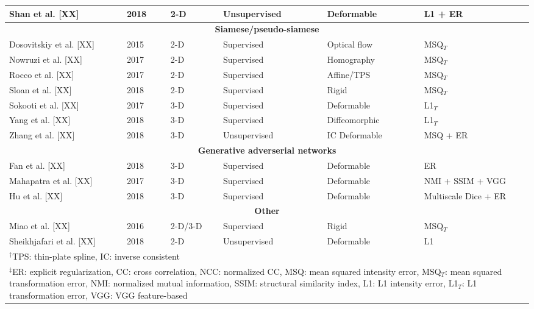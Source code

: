 \begin{table}[!htb]
\begin{tabular*}{\textwidth}{l@{\extracolsep{\fill}}l@{\extracolsep{\fill}}l@{\extracolsep{\fill}}l@{\extracolsep{\fill}}l@{\extracolsep{\fill}}l}
  Shan et al. [XX] & 2018 & 2-D & Unsupervised & Deformable & L1 + ER \\
\midrule
\multicolumn{6}{c}{\textbf{Siamese/pseudo-siamese}}
  \vspace{0.25cm} \\
  Dosovitskiy et al. [XX] & 2015 & 2-D & Supervised & Optical flow & MSQ$_T$ \\ %
  Nowruzi et al. [XX] & 2017 & 2-D & Supervised & Homography & MSQ$_T$ \\
  Rocco et al. [XX] & 2017 & 2-D & Supervised & Affine/TPS & MSQ$_T$ \\
  Sloan et al. [XX] & 2018 & 2-D & Supervised & Rigid & MSQ$_T$ \\  %
  Sokooti et al. [XX] & 2017 & 3-D & Supervised & Deformable & L1$_T$ \\
  Yang et al. [XX] & 2018 & 3-D & Supervised & Diffeomorphic & L1$_T$ \\  %
  Zhang et al. [XX] & 2018 & 3-D & Unsupervised & IC Deformable & MSQ + ER \\
\midrule
\multicolumn{6}{c}{\textbf{Generative adverserial networks}}
  \vspace{0.25cm} \\
  Fan et al. [XX] & 2018 & 3-D & Supervised & Deformable & ER \\
  Mahapatra et al. [XX] & 2017 & 3-D & Supervised & Deformable & NMI + SSIM + VGG \\
  Hu et al. [XX] & 2018 & 3-D & Supervised & Deformable & Multiscale Dice + ER \\
\midrule
\multicolumn{6}{c}{\textbf{Other}}
  \vspace{0.25cm} \\
  Miao et al. [XX] & 2016 & 2-D/3-D & Supervised & Rigid & MSQ$_T$ \\
  Sheikhjafari et al. [XX] & 2018 & 2-D & Unsupervised & Deformable & L1 \\
\bottomrule
\multicolumn{6}{l}{
  \begin{minipage}[t]{0.9\columnwidth}%
    \footnotesize{$^\dagger$TPS: thin-plate spline, IC: inverse consistent}
  \end{minipage}
  } \\
\multicolumn{6}{l}{
  \begin{minipage}[t]{0.92\columnwidth}%
    \footnotesize{$^\ddagger$ER:  explicit regularization,
      CC: cross correlation, NCC: normalized CC, MSQ: mean squared intensity error,
      MSQ$_T$: mean squared transformation error,
      NMI:  normalized mutual information, SSIM:  structural similarity index,
      L1:  L1 intensity error,
      L1$_T$: L1 transformation error, VGG: VGG feature-based}
  \end{minipage}
  }
\end{tabular*}
\end{table}

